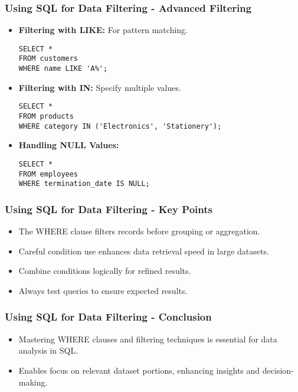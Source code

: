 \documentclass{beamer}
\begin{document}
\begin{frame}[fragile]
    \frametitle{Using SQL for Data Filtering - Advanced Filtering}
    \begin{itemize}
        \item \textbf{Filtering with LIKE:} For pattern matching.
        \begin{lstlisting}
SELECT * 
FROM customers 
WHERE name LIKE 'A%';
        \end{lstlisting}
        \item \textbf{Filtering with IN:} Specify multiple values.
        \begin{lstlisting}
SELECT * 
FROM products 
WHERE category IN ('Electronics', 'Stationery');
        \end{lstlisting}
        \item \textbf{Handling NULL Values:}
        \begin{lstlisting}
SELECT * 
FROM employees 
WHERE termination_date IS NULL;
        \end{lstlisting}
    \end{itemize}
\end{frame}

\begin{frame}[fragile]
    \frametitle{Using SQL for Data Filtering - Key Points}
    \begin{itemize}
        \item The WHERE clause filters records before grouping or aggregation.
        \item Careful condition use enhances data retrieval speed in large datasets.
        \item Combine conditions logically for refined results.
        \item Always test queries to ensure expected results.
    \end{itemize}
\end{frame}

\begin{frame}[fragile]
    \frametitle{Using SQL for Data Filtering - Conclusion}
    \begin{itemize}
        \item Mastering WHERE clauses and filtering techniques is essential for data analysis in SQL.
        \item Enables focus on relevant dataset portions, enhancing insights and decision-making.
    \end{itemize}
\end{frame}
\end{document}
